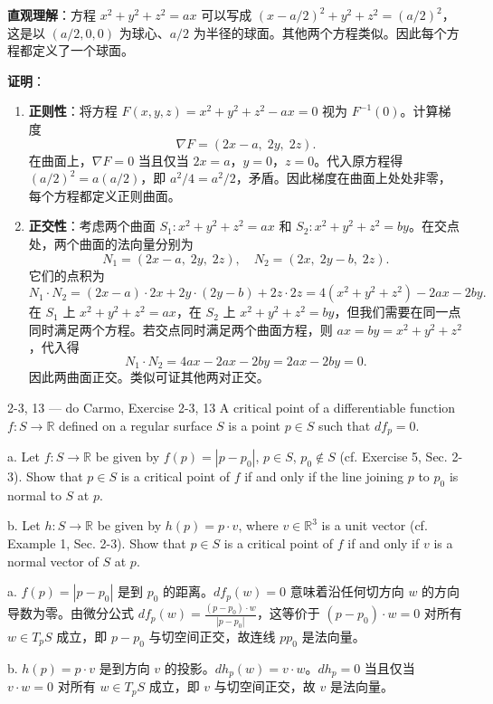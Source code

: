 \begin{solution}
\textbf{直观理解}：方程 $x^2 + y^2 + z^2 = ax$ 可以写成 $(x - a/2)^2 + y^2 + z^2 = (a/2)^2$，这是以 $(a/2, 0, 0)$ 为球心、$a/2$ 为半径的球面。其他两个方程类似。因此每个方程都定义了一个球面。

\textbf{证明}：
\begin{enumerate}
    \item \textbf{正则性}：将方程 $F(x,y,z) = x^2 + y^2 + z^2 - ax = 0$ 视为 $F^{-1}(0)$。计算梯度
    \[
    \nabla F = (2x - a,\; 2y,\; 2z).
    \]
    在曲面上，$\nabla F = 0$ 当且仅当 $2x = a$，$y = 0$，$z = 0$。代入原方程得 $(a/2)^2 = a(a/2)$，即 $a^2/4 = a^2/2$，矛盾。因此梯度在曲面上处处非零，每个方程都定义正则曲面。

    \item \textbf{正交性}：考虑两个曲面 $S_1: x^2+y^2+z^2=ax$ 和 $S_2: x^2+y^2+z^2=by$。在交点处，两个曲面的法向量分别为
    \[
    N_1 = (2x-a,\; 2y,\; 2z),\quad N_2 = (2x,\; 2y-b,\; 2z).
    \]
    它们的点积为
    \[
    N_1 \cdot N_2 = (2x-a)\cdot 2x + 2y\cdot(2y-b) + 2z\cdot 2z = 4(x^2+y^2+z^2) - 2ax - 2by.
    \]
    在 $S_1$ 上 $x^2+y^2+z^2 = ax$，在 $S_2$ 上 $x^2+y^2+z^2 = by$，但我们需要在同一点同时满足两个方程。若交点同时满足两个曲面方程，则 $ax = by = x^2+y^2+z^2$，代入得
    \[
    N_1 \cdot N_2 = 4ax - 2ax - 2by = 2ax - 2by = 0.
    \]
    因此两曲面正交。类似可证其他两对正交。
\end{enumerate}
\end{solution}

\begin{exercise}{2-3, 13 — do Carmo, Exercise 2-3, 13}
A critical point of a differentiable function $f: S \to \mathbb{R}$ defined on a regular surface $S$ is a point $p \in S$ such that $df_p = 0$.

a. Let $f: S \to \mathbb{R}$ be given by $f(p) = |p - p_0|$, $p \in S$, $p_0 \notin S$ (cf. Exercise 5, Sec. 2-3). Show that $p \in S$ is a critical point of $f$ if and only if the line joining $p$ to $p_0$ is normal to $S$ at $p$.

b. Let $h: S \to \mathbb{R}$ be given by $h(p) = p \cdot v$, where $v \in \mathbb{R}^3$ is a unit vector (cf. Example 1, Sec. 2-3). Show that $p \in S$ is a critical point of $f$ if and only if $v$ is a normal vector of $S$ at $p$.
\end{exercise}

\begin{solution}
a. $f(p) = |p - p_0|$ 是到 $p_0$ 的距离。$df_p(w) = 0$ 意味着沿任何切方向 $w$ 的方向导数为零。由微分公式 $df_p(w) = \frac{(p - p_0) \cdot w}{|p - p_0|}$，这等价于 $(p - p_0) \cdot w = 0$ 对所有 $w \in T_pS$ 成立，即 $p - p_0$ 与切空间正交，故连线 $pp_0$ 是法向量。

b. $h(p) = p \cdot v$ 是到方向 $v$ 的投影。$dh_p(w) = v \cdot w$。$dh_p = 0$ 当且仅当 $v \cdot w = 0$ 对所有 $w \in T_pS$ 成立，即 $v$ 与切空间正交，故 $v$ 是法向量。
\end{solution}


